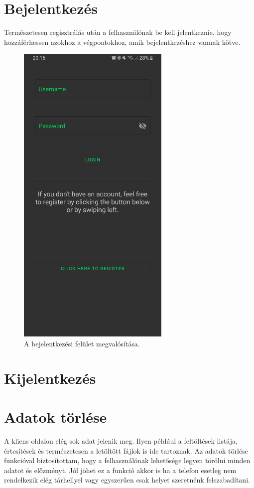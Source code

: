 \documentclass{thesis-ekf}
\theoremstyle{definition}
\theoremstyle{remark}
\begin{document}
\section{Bejelentkezés}

Természetesen regisztrálás után a felhasználónak be kell jelentkeznie, hogy hozzáférhessen azokhoz a végpontokhoz, amik bejelentkezéshez vannak kötve.

\begin{figure}[!h]
	\centering
	\includegraphics[height=15cm]{pictures/login}
	\caption{A bejelentkezési felület megvalósítása.}
	\label{login}
\end{figure}

\section{Kijelentkezés}

\section{Adatok törlése}

A kliens oldalon elég sok adat jelenik meg. 
Ilyen például a feltöltések listája, értesítések és természetesen a letöltött fájlok is ide tartoznak.
Az adatok törlése funkcióval biztosítottam, hogy a felhasználónak lehetősége legyen törölni minden adatot és előzményt.
Jól jöhet ez a funkció akkor is ha a telefon esetleg nem rendelkezik elég tárhellyel vagy egyszerűen csak helyet szeretnénk felszabadítani.
\end{document}
